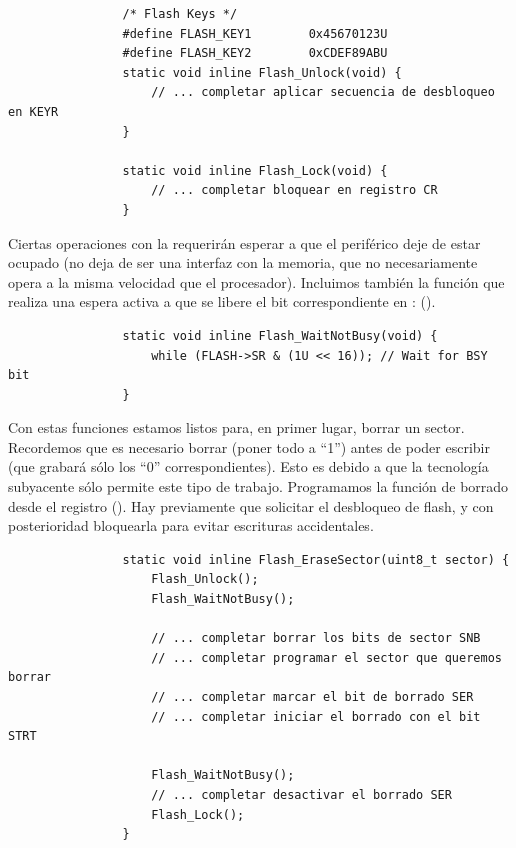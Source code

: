 \documentclass[../main.tex]{subfiles}
\begin{document}
            \begin{lstlisting}
                /* Flash Keys */
                #define FLASH_KEY1        0x45670123U
                #define FLASH_KEY2        0xCDEF89ABU
                static void inline Flash_Unlock(void) {
                    // ... completar aplicar secuencia de desbloqueo en KEYR
                }

                static void inline Flash_Lock(void) {
                    // ... completar bloquear en registro CR
                }
            \end{lstlisting}

            Ciertas operaciones con la  requerirán esperar a que el periférico deje de estar ocupado (no deja de ser una interfaz con la memoria, que no necesariamente opera a la misma velocidad que el procesador). Incluimos también la función que realiza una espera activa a que se libere el bit correspondiente en : (\REFMAN[3.7.4]).
            
            \begin{lstlisting}
                static void inline Flash_WaitNotBusy(void) {
                    while (FLASH->SR & (1U << 16)); // Wait for BSY bit
                }
            \end{lstlisting}

            Con estas funciones estamos listos para, en primer lugar, borrar un sector. Recordemos que es necesario borrar (poner todo a ``1'') antes de poder escribir (que grabará sólo los ``0'' correspondientes). Esto es debido a que la tecnología subyacente sólo permite este tipo de trabajo. Programamos la función de borrado desde el registro  (\REFMAN[3.7.5]). Hay previamente que solicitar el desbloqueo de flash, y con posterioridad bloquearla para evitar escrituras accidentales.

            \begin{lstlisting}
                static void inline Flash_EraseSector(uint8_t sector) {
                    Flash_Unlock();
                    Flash_WaitNotBusy();

                    // ... completar borrar los bits de sector SNB
                    // ... completar programar el sector que queremos borrar
                    // ... completar marcar el bit de borrado SER
                    // ... completar iniciar el borrado con el bit STRT

                    Flash_WaitNotBusy();
                    // ... completar desactivar el borrado SER
                    Flash_Lock();
                }
            \end{lstlisting}
\end{document}
